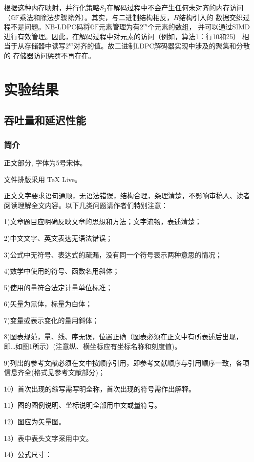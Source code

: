 \documentclass{cjc}
\begin{document}
  根据这种内存映射，并行化策略$S_3$在解码过程中不会产生任何未对齐的内存访问
  （$\mathbb{GF}$乘法和除法步骤除外）。其实，与二进制结构相反，$H$结构引入的
  数据交织过程不是问题。NB-LDPC码将$\mathbb{GF}$元素管理为有$2^m$个元素的数组，
  并可以通过SIMD进行有效管理。因此，在解码过程中对元素的访问（例如，算法1：行10和25）
  相当于从存储器中读写$2^m$对齐的值。故二进制LDPC解码器实现中涉及的聚集和分散的
  存储器访问惩罚不再存在。

\section{实验结果}\label{sec:experiment}
\subsection{吞吐量和延迟性能}
\subsubsection{简介}\label{sssec:experiment11}

正文部分, 字体为5号宋体。

文件排版采用 TeX Live。

正文文字要求语句通顺，无语法错误，结构合理，条理清楚，不影响审稿人、读者阅读理解全文内容。以下几类问题请作者们特别注意：

1)文章题目应明确反映文章的思想和方法；文字流畅，表述清楚；

2)中文文字、英文表达无语法错误；

3)公式中无符号、表达式的疏漏，没有同一个符号表示两种意思的情况；

4)数学中使用的符号、函数名用斜体；

5)使用的量符合法定计量单位标准；

6)矢量为黑体，标量为白体；

7)变量或表示变化的量用斜体；

8)图表规范，量、线、序无误，位置正确（图表必须在正文中有所表述后出现，即…如图1所示）(注意纵、横坐标应有坐标名称和刻度值)。

9)列出的参考文献必须在文中按顺序引用，即参考文献顺序与引用顺序一致，各项信息齐全(格式见参考文献部分)；

10）首次出现的缩写需写明全称，首次出现的符号需作出解释。

11）图的图例说明、坐标说明全部用中文或量符号。

12）图应为矢量图。

13）表中表头文字采用中文。

14）公式尺寸：
\end{document}
